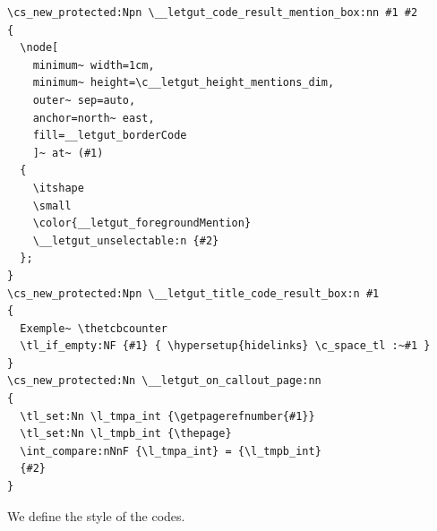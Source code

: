 \documentclass{letgut}
\begin{document}
\begin{lstlisting}
\cs_new_protected:Npn \__letgut_code_result_mention_box:nn #1 #2
{
  \node[
    minimum~ width=1cm,
    minimum~ height=\c__letgut_height_mentions_dim,
    outer~ sep=auto,
    anchor=north~ east,
    fill=__letgut_borderCode
    ]~ at~ (#1)
  {
    \itshape
    \small
    \color{__letgut_foregroundMention}
    \__letgut_unselectable:n {#2}
  };
}
\cs_new_protected:Npn \__letgut_title_code_result_box:n #1
{
  Exemple~ \thetcbcounter
  \tl_if_empty:NF {#1} { \hypersetup{hidelinks} \c_space_tl :~#1 }
}
\cs_new_protected:Nn \__letgut_on_callout_page:nn
{
  \tl_set:Nn \l_tmpa_int {\getpagerefnumber{#1}}
  \tl_set:Nn \l_tmpb_int {\thepage}
  \int_compare:nNnF {\l_tmpa_int} = {\l_tmpb_int}
  {#2}
}
\end{lstlisting}

We define the style of the codes.
\end{document}
